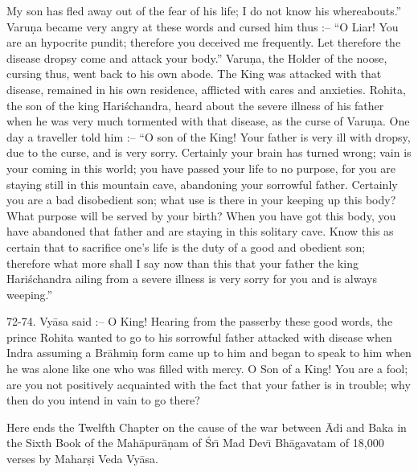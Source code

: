My son has fled away out of the fear of his life; I do not know his whereabouts.'' Varu\d{n}a became very angry at these words and cursed him thus :-- ``O Liar! You are an hypocrite pundit; therefore you deceived me frequently. Let therefore the disease dropsy come and attack your body.'' Varu\d{n}a, the Holder of the noose, cursing thus, went back to his own abode. The King was attacked with that disease, remained in his own residence, afflicted with cares and anxieties. Rohita, the son of the king Hari\'schandra, heard about the severe illness of his father when he was very much tormented with that disease, as the curse of Varu\d{n}a. One day a traveller told him :-- ``O son of the King! Your father is very ill with dropsy, due to the curse, and is very sorry. Certainly your brain has turned wrong; vain is your coming in this world; you have passed your life to no purpose, for you are staying still in this mountain cave, abandoning your sorrowful father. Certainly you are a bad disobedient son; what use is there in your keeping up this body? What purpose will be served by your birth? When you have got this body, you have abandoned that father and are staying in this solitary cave. Know this as certain that to sacrifice one's life is the duty of a good and obedient son; therefore what more shall I say now than this that your father the king Hari\'schandra ailing from a severe illness is very sorry for you and is always weeping.''

72-74. Vy\=asa said :-- O King! Hearing from the passerby these good words, the prince Rohita wanted to go to his sorrowful father attacked with disease when Indra assuming a Br\=ahmi\d{n} form came up to him and began to speak to him when he was alone like one who was filled with mercy. O Son of a King! You are a fool; are you not positively acquainted with the fact that your father is in trouble; why then do you intend in vain to go there?

Here ends the Twelfth Chapter on the cause of the war between \=Adi and Baka in the Sixth Book of the Mah\=apur\=a\d{n}am of \'Sr\={\i} Mad Dev\={\i} Bh\=agavatam of 18,000 verses by Mahar\d{s}i Veda Vy\=asa.



